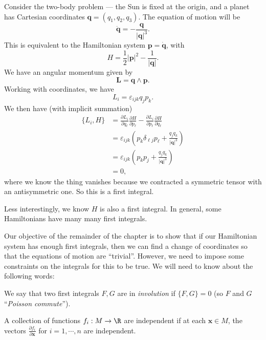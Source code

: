 \documentclass[a4paper]{article}
\begin{document}
\begin{eg}
  Consider the two-body problem --- the Sun is fixed at the origin, and a planet has Cartesian coordinates $\mathbf{q} = (q_1, q_2, q_3)$. The equation of motion will be
  \[
    \ddot{\mathbf{q}} = - \frac{\mathbf{q}}{|\mathbf{q}|^3}.
  \]
  This is equivalent to the Hamiltonian system $\mathbf{p} = \dot{\mathbf{q}}$, with
  \[
    H = \frac{1}{2} |\mathbf{p}|^2 - \frac{1}{|\mathbf{q}|}.
  \]
  We have an angular momentum given by
  \[
    \mathbf{L} = \mathbf{q} \wedge \mathbf{p}.
  \]
  Working with coordinates, we have
  \[
    L_i = \varepsilon_{ijk} q_j p_k.
  \]
  We then have (with implicit summation)
  \begin{align*}
    \{L_i, H\} &= \frac{\partial L_i}{\partial q_\ell}\frac{\partial H}{\partial p_\ell} - \frac{\partial L_i}{\partial p_\ell} \frac{\partial H}{\partial q_\ell}\\
    &= \varepsilon_{ijk} \left(p_k \delta_{\ell j}p_\ell + \frac{q_j q_k}{|\mathbf{q}|^3}\right)\\
    &= \varepsilon_{ijk} \left(p_k p_j + \frac{q_j q_k}{|\mathbf{q}|^3}\right)\\
    &= 0,
  \end{align*}
  where we know the thing vanishes because we contracted a symmetric tensor with an antisymmetric one. So this is a first integral.

  Less interestingly, we know $H$ is also a first integral. In general, some Hamiltonians have many many first integrals.
\end{eg}

Our objective of the remainder of the chapter is to show that if our Hamiltonian system has enough first integrals, then we can find a change of coordinates so that the equations of motion are ``trivial''. However, we need to impose some constraints on the integrals for this to be true. We will need to know about the following words:
\begin{defi}[Involution]
  We say that two first integrals $F, G$ are in \emph{involution} if $\{F, G\} = 0$ (so $F$ and $G$ ``\emph{Poisson commute}'').
\end{defi}

\begin{defi}
  A collection of functions $f_i: M \to \R$ are independent if at each $\mathbf{x} \in M$, the vectors $\frac{\partial f_i}{\partial \mathbf{x}}$ for $i = 1, \cdots, n$ are independent.
\end{defi}
\end{document}
